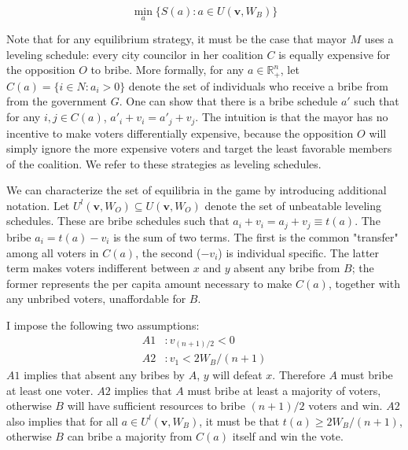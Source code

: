 \begin{equation}
    \label{eqn:solution}
    \min_a\{S(a) : a \in U(\mathbf{v}, W_B) \}
\end{equation}

Note that for any equilibrium strategy, it must be the case that mayor $M$ uses a leveling schedule: every city councilor in her coalition $C$ is equally expensive for the opposition $O$ to bribe. More formally, for any $a \in \mathbb{R}_+^n$, let $C(a) = \{i \in N : a_i > 0\}$ denote the set of individuals who receive a bribe from from the government $G$. One can show that there is a bribe schedule $a'$ such that for any $i,j \in C(a)$, $a'_i + v_i = a'_j + v_j$. The intuition is that the mayor has no incentive to make voters differentially expensive, because the opposition $O$ will simply ignore the more expensive voters and target the least favorable members of the coalition. We refer to these strategies as leveling schedules.

We can characterize the set of equilibria in the game by introducing additional notation. Let $U^l(\mathbf{v}, W_O) \subseteq U(\mathbf{v}, W_O)$ denote the set of unbeatable leveling schedules. These are bribe schedules such that $a_i + v_i = a_j + v_j  \equiv t(a)$. The bribe $a_i = t(a) - v_i$ is the sum of two terms. The first is the common "transfer" among all voters in $C(a)$, the second ($-v_i$) is individual specific. The latter term makes voters indifferent between $x$ and $y$ absent any bribe from $B$; the former represents the per capita amount necessary to make $C(a)$, together with any unbribed voters, unaffordable for $B$.

I impose the following two assumptions:
\begin{align*}
    A1 &: v_{(n+1)/2} < 0\\
    A2 &: v_1 < 2W_B/(n+1) 
\end{align*}
$A1$ implies that absent any bribes by $A$, $y$ will defeat $x$. Therefore $A$ must bribe at least one voter. $A2$ implies that $A$ must bribe at least a majority of voters, otherwise $B$ will have sufficient resources to bribe $(n+1)/2$ voters and win. $A2$ also implies that for all $a \in U^l(\mathbf{v}, W_B)$, it must be that $t(a) \geq 2W_B/(n + 1)$, otherwise $B$ can bribe a majority from $C(a)$ itself and win the vote.


